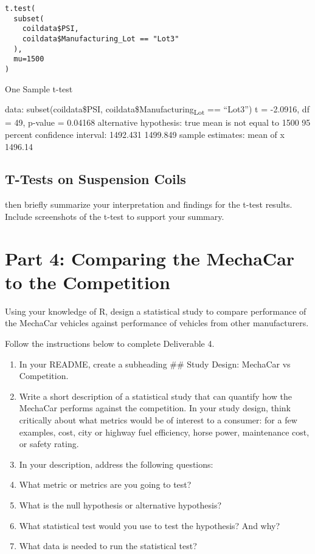 \documentclass[11pt]{article}
\begin{document}
\begin{verbatim}
t.test(
  subset(
    coildata$PSI,
    coildata$Manufacturing_Lot == "Lot3"
  ),
  mu=1500
)
\end{verbatim}

\begin{org}


One Sample t-test

data:  subset(coildata\$PSI, coildata\$Manufacturing\textsubscript{Lot} == ``Lot3'')
t = -2.0916, df = 49, p-value = 0.04168
alternative hypothesis: true mean is not equal to 1500
95 percent confidence interval:
 1492.431 1499.849
sample estimates:
mean of x
  1496.14
\end{org}


\subsection{T-Tests on Suspension Coils}
\label{sec:orgf8e82b6}

then briefly summarize your interpretation and findings for the t-test results. Include screenshots of the t-test to support your summary.

\section{Part 4: Comparing the MechaCar to the Competition}
\label{sec:org19131cf}

Using your knowledge of R, design a statistical study to compare performance of the MechaCar vehicles against performance of vehicles from other manufacturers.

Follow the instructions below to complete Deliverable 4.

\begin{enumerate}
\item In your README, create a subheading \#\# Study Design: MechaCar vs Competition.
\item Write a short description of a statistical study that can quantify how the MechaCar performs against the competition. In your study design, think critically about what metrics would be of interest to a consumer: for a few examples, cost, city or highway fuel efficiency, horse power, maintenance cost, or safety rating.
\item In your description, address the following questions:

\item What metric or metrics are you going to test?
\item What is the null hypothesis or alternative hypothesis?
\item What statistical test would you use to test the hypothesis? And why?
\item What data is needed to run the statistical test?
\end{enumerate}
\end{document}
